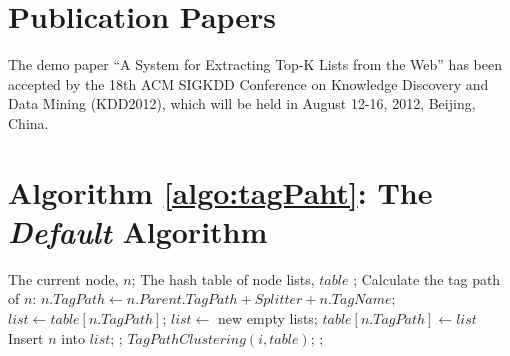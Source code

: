 \appendix{}
\section{Publication Papers}
The demo paper\cite{ZZX2012KDD} ``A System for Extracting Top-K Lists from the Web'' has been accepted by
the 18th ACM SIGKDD Conference on Knowledge Discovery and Data Mining (KDD2012), which will be held in
August 12-16, 2012, Beijing, China.


\section{Algorithm \ref{algo:tagPaht}: The {\em Default} Algorithm}
\label{appendix:algo}


\begin{algorithm}
\caption{$TagPathClustering(n,table)$}
\label{algo:tagPaht}
\begin{algorithmic}[1]
\REQUIRE
    The current node, $n$;
    The hash table of node lists, $table$ ;
\STATE  Calculate the tag path of $n$:
        $n.TagPath \gets n.Parent.TagPath+Splitter+n.TagName;$
        \STATE  $list \gets table[n.TagPath]$;
    \ELSE
        \STATE  $list \gets$ new empty lists;
        \STATE  $table[n.TagPath] \gets list$
    \ENDIF
    \STATE  Insert $n$ into $list$;
    \RETURN;
\ENDIF
{}
    \STATE $TagPathClustering(i,table)$;
\ENDFOR
\RETURN;

\end{algorithmic}
\end{algorithm}
